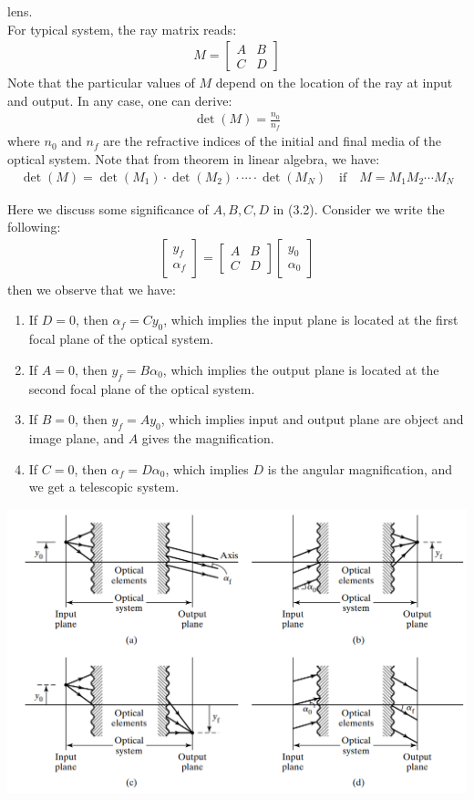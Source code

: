 \documentclass[11pt]{book}
\theoremstyle{break}
\theoremstyle{break}
\newcommand{\C}{\mathbb{C}}
\newcommand{\bmat}[1]{\begin{bmatrix} #1 \end{bmatrix}}
\begin{document}
lens.\\
\hfill\break
\hfill\break
For typical system, the ray matrix reads:
\begin{align}
M = \bmat{A&B \\C &D}
\end{align}
Note that the particular values of $M$ depend on the location of the ray at input and output. In any case, one can derive:
\begin{align*}
\det(M) = \frac{n_0}{n_f}
\end{align*}
where $n_0$ and $n_f$ are the refractive indices of the initial and final media of the optical system. Note that from theorem in linear algebra, we have:
\begin{align*}
\det(M) = \det(M_1)\cdot \det(M_2)\cdot \cdots \cdot \det(M_N) \quad\text{if}\quad M = M_1 M_2 \cdots M_N
\end{align*}

Here we discuss some significance of $A,B,C,D$ in (3.2). Consider we write the following:
\begin{align*}
\bmat{y_f \\ \alpha_f} = \bmat{A & B \\C&D} \bmat{y_0 \\ \alpha_0}
\end{align*}
then we observe that we have:
\begin{enumerate}[label=(\alph*), topsep=3pt,itemsep=-1ex,partopsep=1ex,parsep=1ex]
\item If $D = 0$, then $\alpha_f = Cy_0$, which implies the input plane is located at the first focal plane of the optical system.
\item If $A = 0$, then $y_f = B\alpha_0$, which implies the output plane is located at the second focal plane of the optical system.
\item If $B = 0$, then $y_f = Ay_0$, which implies input and output plane are object and image  plane, and $A$ gives the magnification.
\item If $C = 0$, then $\alpha_f = D\alpha_0$, which implies $D$ is the angular magnification, and we get a telescopic system.
\end{enumerate}

\begin{center}
\includegraphics[scale=0.5]{ABCD.png}
\end{center}
\end{document}
